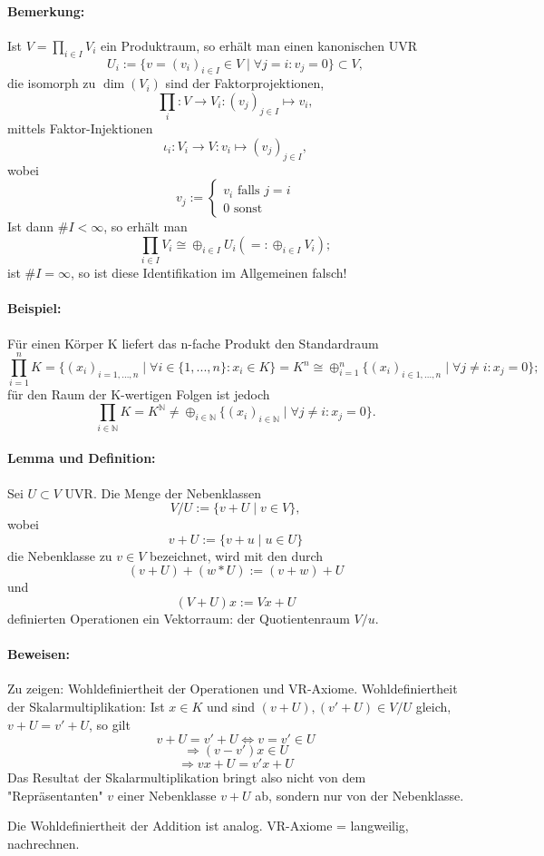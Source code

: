 \paragraph{Bemerkung: } 
		Ist $V = \prod_{i\in I} V_i$ ein Produktraum, so erhält man einen kanonischen UVR
			\[U_i:=\{v=(v_i)_{i\in I}\in V\mid\forall j = i:v_j = 0\}\subset V,\]
		die isomorph zu $\dim(V_i)$ sind der Faktorprojektionen,
			\[\prod_i:V\to V_i:(v_j)_{j\in I} \mapsto v_i,\]
		mittels Faktor-Injektionen
			\[\iota_i:V_i\to V: v_i \mapsto(v_j)_{j\in I},\]
		wobei
			\[v_j :=
				\begin{cases}
					v_i \text{ falls } j=i\\
					0 \text{ sonst}
				\end{cases}
			\]
		Ist dann $\# I < \infty$, so erhält man
			\[\prod_{i\in I} V_i\cong \oplus_{i\in I}U_i (=: \oplus_{i\in I}V_i);\]
		ist $\#I=\infty$, so ist diese Identifikation im Allgemeinen falsch!
	
\paragraph{Beispiel: }
	Für einen Körper K liefert das n-fache Produkt den Standardraum
		\[\prod_{i=1}^{n}K = \{(x_i)_{i = 1,...,n}\mid\forall i \in \{1,...,n\}: x_i \in K\} = K^n \cong \oplus_{i=1}^n\{(x_i)_{i\in {1,...,n}}\mid\forall j\neq i: x_j = 0\};\]
	für den Raum der K-wertigen Folgen ist jedoch
		\[\prod_{i\in \mathbb{N}}K=K^{\mathbb{N}}\neq\oplus_{i\in \mathbb{N}}\{(x_i)_{i\in \mathbb{N}}\mid\forall j\neq i: x_j=0\}.\]
			
\paragraph{Lemma und Definition: }
	Sei $U\subset V$ UVR. Die Menge der Nebenklassen 
		\[V/U := \{v+U\mid v\in V\},\]
	wobei
		\[v+U:=\{v+u\mid u\in U\}\]
	die Nebenklasse zu $v\in V$ bezeichnet, wird mit den durch
		\[(v+U)+(w*U):=(v+w)+U\]
	und
		\[(V+U)x := Vx + U\]
	definierten Operationen ein Vektorraum: der Quotientenraum $V/u$.
			
\paragraph{Beweisen: }
	Zu zeigen: Wohldefiniertheit der Operationen und VR-Axiome. Wohldefiniertheit der Skalarmultiplikation: Ist $x\in K$ und sind $(v+U),(v'+U)\in V/U$ gleich, $v+U = v' + U$, so gilt
		\[v+U = v'+U \Leftrightarrow v = v'\in U\] \[\Rightarrow (v-v')x \in U\]
		\[\Rightarrow vx+U=v' x+U\]
	Das Resultat der Skalarmultiplikation bringt also nicht von dem "Repräsentanten" $v$ einer Nebenklasse $v+U$ ab, sondern nur von der Nebenklasse.
	
	Die Wohldefiniertheit der Addition ist analog.
	VR-Axiome = langweilig, nachrechnen.
